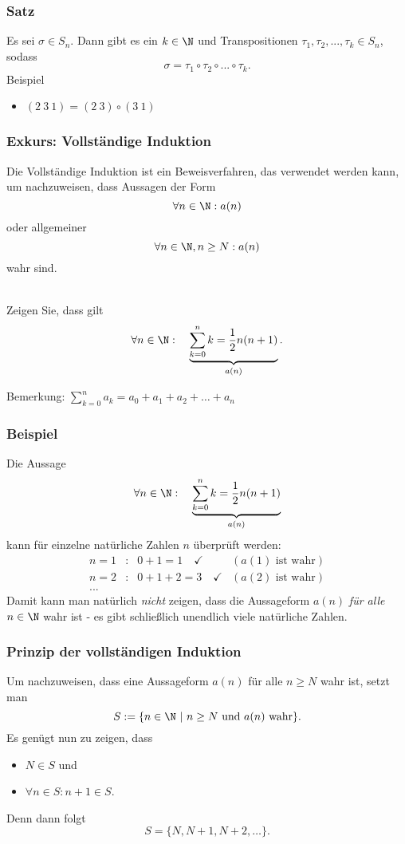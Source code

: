 %
\begin{frame}\frametitle{Satz}
	
Es sei $\sigma \in S_n$. Dann gibt es ein $k \in \N$ und Transpositionen $\tau_1,\tau_2,...,\tau_k \in S_n$, sodass
$$ \sigma=\tau_1 \circ \tau_2 \circ ... \circ \tau_k. $$
\vfill \pause
Beispiel
\begin{itemize}
\item $(2\ 3\ 1) = (2\ 3) \circ (3\ 1)$
\end{itemize}
\end{frame}
%
%
\begin{frame}\frametitle{Exkurs: Vollständige Induktion}

	Die Vollständige Induktion ist ein Beweisverfahren, das verwendet werden kann, um nachzuweisen, dass Aussagen der Form
	$$
		\forall n\in\N : a(n)	
	$$	
	oder allgemeiner
	$$
		\forall n \in \N, n\ge N: a(n)
	$$
	wahr sind.
	
	\pause
	\vspace{2mm}
	 \\
	Zeigen Sie, dass gilt
	$$
		\forall n\in \N:\quad  \underbrace{\sum_{k=0}^n k = \frac{1}{2}n(n+1)}_{a(n)}.
	$$	
	
	\vfill
	{\scriptsize Bemerkung: $\displaystyle\sum_{k=0}^n a_k = a_0 + a_1 + a_2 + \ldots + a_n$} 
\end{frame}
%
%
\begin{frame}\frametitle{Beispiel}
	Die Aussage
	$$
		\forall n\in \N:\quad  \underbrace{\sum_{k=0}^n k = \frac{1}{2}n(n+1)}_{a(n)}
	$$	
	kann für einzelne natürliche Zahlen $n$ überprüft werden: 
	$$
		\begin{array}{lcll}
			n=1	&:& 0+1=1\quad \checkmark	&(a(1)\text{~ist wahr})		\\
			n=2	&:& 0+1+2=3\quad \checkmark	&(a(2)\text{~ist wahr})	\\
			...
		\end{array}
	$$
	\pause
	Damit kann man natürlich {\em nicht} zeigen, 
	dass die Aussageform $a(n)$ {\em für alle} $n\in\N$ wahr ist - es gibt schlie{\ss}lich unendlich viele natürliche Zahlen.
\end{frame}
%
%
\begin{frame}\frametitle{Prinzip der vollständigen Induktion}
	
	Um nachzuweisen, dass eine Aussageform $a(n)$ für alle $n\geq N$ wahr ist, setzt man
	$$
		S := \{ n\in \N~|~ n\geq N \text{~und~} a(n)\text{~wahr} \}.
	$$\pause
	\vfill
	Es genügt nun zu zeigen, dass
	\begin{itemize}
		\item $N\in S$ und
		\item $\forall n\in S: n+1 \in S$.
	\end{itemize}
	Denn dann folgt
	$$
		S = \{N, N+1, N+2,\ldots\}.
	$$
	
\end{frame}
